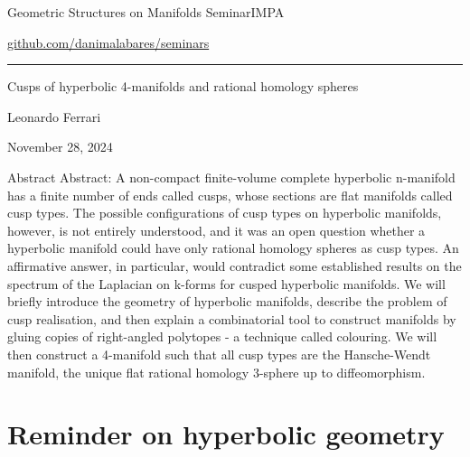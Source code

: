 


\begin{minipage}{\textwidth}
	\begin{minipage}{1\textwidth}
		Geometric Structures on Manifolds Seminar\hfill IMPA
		
		{\small\hfill\href{https://github.com/danimalabares/seminars}{github.com/danimalabares/seminars}}
		
	\end{minipage}
\end{minipage}\vspace{.2cm}\hrule

\vspace{10pt}

{\Huge Cusps of hyperbolic 4-manifolds and rational homology spheres}

\hfill{\Large Leonardo Ferrari}

\hfill{\large November 28, 2024}

\begin{thing4}{Abstract}\leavevmode
Abstract: A non-compact finite-volume complete hyperbolic n-manifold has a finite number of ends called cusps, whose sections are flat manifolds called cusp types. The possible configurations of cusp types on hyperbolic manifolds, however, is not entirely understood, and it was an open question whether a hyperbolic manifold could have only rational homology spheres as cusp types. An affirmative answer, in particular, would contradict some established results on the spectrum of the Laplacian on k-forms for cusped hyperbolic manifolds. We will briefly introduce the geometry of hyperbolic manifolds, describe the problem of cusp realisation, and then explain a combinatorial tool to construct manifolds by gluing copies of right-angled polytopes - a technique called colouring. We will then construct a 4-manifold such that all cusp types are the Hansche-Wendt manifold, the unique flat rational homology 3-sphere up to diffeomorphism.
\end{thing4}

\tableofcontents

\section{Reminder on hyperbolic geometry}

